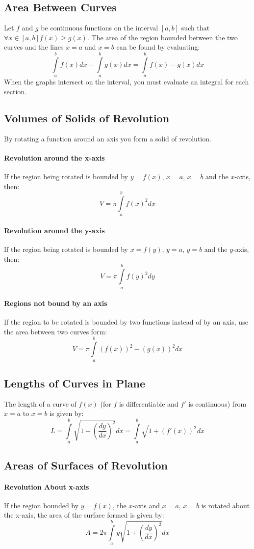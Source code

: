 \documentclass[a4paper,twoside]{article}
\begin{document}
		\subsection{Area Between Curves}
			Let $f$ and $g$ be continuous functions on the interval $[a,b]$ such that $\forall x\in[a,b] f(x)\geq g(x)$. The area of the region bounded between the two curves and the lines $x=a$ and $x=b$ can be found by evaluating:
			\[
				\int\limits_a^bf(x)dx-\int\limits_a^bg(x)dx=\int\limits_a^bf(x)-g(x)dx
			\]
			When the graphs intersect on the interval, you must evaluate an integral for each section.
		\subsection{Volumes of Solids of Revolution}
			By rotating a function around an axis you form a solid of revolution.
			\paragraph{Revolution around the x-axis} If the region being rotated is bounded by $y=f(x)$, $x=a$, $x=b$ and the $x$-axis, then:
			\[
				V=\pi\int\limits_a^bf(x)^2dx
			\]
			\paragraph{Revolution around the y-axis} If the region being rotated is bounded by $x=f(y)$, $y=a$, $y=b$ and the $y$-axis, then:
			\[
				V=\pi\int\limits_a^bf(y)^2dy
			\]
			\paragraph{Regions not bound by an axis} If the region to be rotated is bounded by two functions instead of by an axis, use the area between two curves form:
			\[
				V=\pi\int\limits_a^b(f(x))^2-(g(x))^2dx
			\]
		\subsection{Lengths of Curves in Plane}
			The length of a curve of $f(x)$ (for $f$ is differentiable and $f'$ is continuous) from $x=a$ to $x=b$ is given by:
			\[
				L=\int\limits_a^b\sqrt{1+\left(\frac{dy}{dx}\right)^2}dx=\int\limits_a^b\sqrt{1+\left(f'(x)\right)^2}dx
			\]
		\subsection{Areas of Surfaces of Revolution}
			\paragraph{Revolution About x-axis} If the region bounded by $y=f(x)$, the $x$-axis and $x=a$, $x=b$ is rotated about the x-axis, the area of the surface formed is given by:
			\[
				A=2\pi\int\limits_a^by\sqrt{1+\left(\frac{dy}{dx}\right)^2}dx
			\]
			
\end{document}
